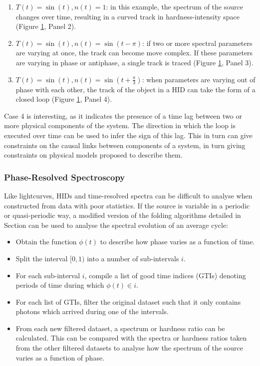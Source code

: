 \begin{enumerate}
\begin{figure}
   \label{fig:HIDexp}
\end{figure}
\item $T(t)=\sin(t), n(t)=1$: in this example, the spectrum of the source changes over time, resulting in a curved track in hardness-intensity space (Figure \ref{fig:HIDexp}, Panel 2).
\item $T(t)=\sin(t), n(t)=\sin(t-\pi)$: if two or more spectral parameters are varying at once, the track can become move complex.  If these parameters are varying in phase or antiphase, a single track is traced (Figure \ref{fig:HIDexp}, Panel 3).
\item $T(t)=\sin(t), n(t)=\sin\left(t+\frac{\pi}{3}\right)$: when parameters are varying out of phase with each other, the track of the object in a HID can take the form of a closed loop (Figure \ref{fig:HIDexp}, Panel 4).
\end{enumerate}
Case 4 is interesting, as it indicates the presence of a time lag between two or more physical components of the system.  The direction in which the loop is executed over time can be used to infer the sign of this lag.  This in turn can give constraints on the causal links between components of a system, in turn giving constraints on physical models proposed to describe them.

\subsubsection{Phase-Resolved Spectroscopy}

\label{sec:phasresspec}

\par Like lightcurves, HIDs and time-resolved spectra can be difficult to analyse when constructed from data with poor statistics.  If the source is variable in a periodic or quasi-periodic way, a modified version of the folding algorithms detailed in Section \label{sec:LCMorph} can be used to analyse the spectral evolution of an average cycle:
\begin{itemize}
\item Obtain the function $\phi(t)$ to describe how phase varies as a function of time.
\item Split the interval $[0,1)$ into a number of sub-intervals $i$.
\item For each sub-interval $i$, compile a list of good time indices (GTIs) denoting periods of time during which $\phi(t)\in i$.
\item For each list of GTIs, filter the original dataset such that it only contains photons which arrived during one of the intervals.
\item From each new filtered dataset, a spectrum or hardness ratio can be calculated.  This can be compared with the spectra or hardness ratios taken from the other filtered datasets to analyse how the spectrum of the source varies as a function of phase.
\end{itemize}



